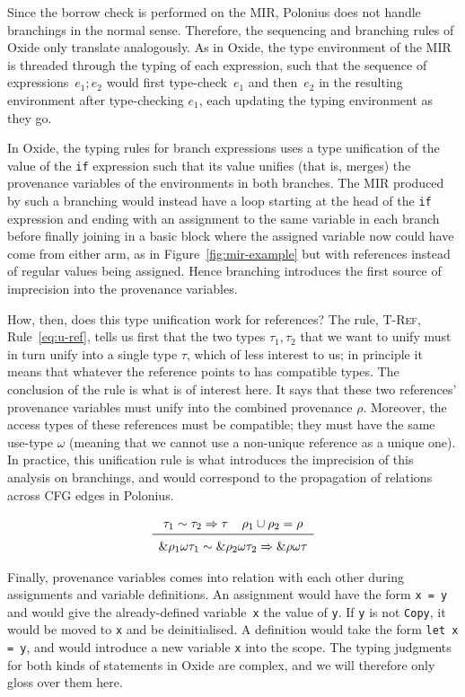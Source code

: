 \documentclass[11pt,a4paper,twoside,openany,draft]{report}
\newcommand{\InRust}[1]{\texttt{#1}}
\newcommand{\expression}[1]{\boxed{#1}}
\newcommand{\ntyperule}[2]{\begin{array}{c}#1\\\midrule\raisebox{1pt}{\strut}#2\end{array}}
\begin{document}
Since the borrow check is performed on the MIR, Polonius does not handle
branchings in the normal sense. Therefore, the sequencing and branching rules of
Oxide only translate analogously. As in Oxide, the type environment of the MIR
is threaded through the typing of each expression, such that the sequence of
expressions~$\expression{e_1; e_2}$ would first type-check~$e_1$ and then~$e_2$
in the resulting environment after type-checking $e_1$, each updating the typing
environment as they go.

In Oxide, the typing rules for branch expressions uses a type unification of the
value of the \InRust{if} expression such that its value unifies (that is,
merges) the provenance variables of the environments in both branches. The MIR
produced by such a branching would instead have a loop starting at the head of
the \InRust{if} expression and ending with an assignment to the same variable in
each branch before finally joining in a basic block where the assigned variable
now could have come from either arm, as in Figure~\ref{fig:mir-example} but with
references instead of regular values being assigned. Hence branching introduces
the first source of imprecision into the provenance variables.

How, then, does this type unification work for references? The rule,
\textsc{T-Ref}, Rule~\eqref{eq:u-ref}, tells us first that the two types
$\tau_1, \tau_2$ that we want to unify must in turn unify into a single type
$\tau$, which of less interest to us; in principle it means that whatever the
reference points to has compatible types. The conclusion of the rule is what is
of interest here. It says that these two references' provenance variables must
unify into the combined provenance $\rho$. Moreover, the access types of these
references must be compatible; they must have the same use-type $\omega$
(meaning that we cannot use a non-unique reference as a unique one). In
practice, this unification rule is what introduces the imprecision of this
analysis on branchings, and would correspond to the propagation of relations
across CFG edges in Polonius.

\begin{equation}\label{eq:u-ref}
  \ntyperule{
    \tau_1 \sim \tau_2 \Rightarrow \tau \:\:\:\:\: \rho_1 \cup \rho_2 = \rho}
  {
    \&\rho_1 \omega \tau_1 \sim \& \rho_2  \omega \tau_2 \Rightarrow \&\rho \omega \tau
  }
\end{equation}

Finally, provenance variables comes into relation with each other during
assignments and variable definitions. An assignment would have the form
\InRust{x = y} and would give the already-defined variable~\InRust{x} the value
of \InRust{y}. If \InRust{y} is not \InRust{Copy}, it would be moved to
\InRust{x} and be deinitialised. A definition would take the form \InRust{let x
  = y}, and would introduce a new variable \InRust{x} into the scope. The typing
judgments for both kinds of statements in Oxide are complex, and we will
therefore only gloss over them here.
\end{document}
